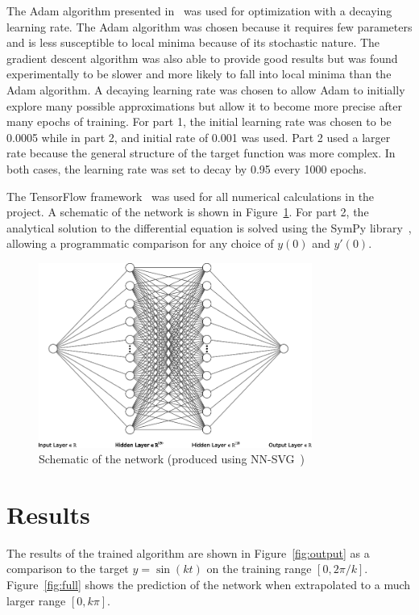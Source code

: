 \documentclass{article}
\begin{document}
        The Adam algorithm presented in~\cite{adam} was used for optimization with a decaying learning rate. The Adam algorithm was chosen because it requires few parameters and is less susceptible to local minima because of its stochastic nature. The gradient descent algorithm was also able to provide good results but was found experimentally to be slower and more likely to fall into local minima than the Adam algorithm. A decaying learning rate was chosen to allow Adam to initially explore many possible approximations but allow it to become more precise after many epochs of training. For part 1, the initial learning rate was chosen to be 0.0005 while in part 2, and initial rate of 0.001 was used. Part 2 used a larger rate because the general structure of the target function was more complex. In both cases, the learning rate was set to decay by 0.95 every 1000 epochs.

        The TensorFlow framework~\cite{tf} was used for all numerical calculations in the project. A schematic of the network is shown in Figure~\ref{fig:network}. For part 2, the analytical solution to the differential equation is solved using the SymPy library~\cite{sympy}, allowing a programmatic comparison for any choice of $y(0)$ and $y'(0)$.

        \begin{figure}[!htbp]
            \centering
            \caption{Schematic of the network (produced using NN-SVG~\cite{schematic})} \label{fig:network}
            \includegraphics[width=0.8\textwidth]{nn.png}
        \end{figure}

    \section{Results}
        The results of the trained algorithm are shown in Figure~\ref{fig:output} as a comparison to the target $y=\sin(kt)$ on the training range $[0,2\pi/k]$. Figure~\ref{fig:full} shows the prediction of the network when extrapolated to a much larger range $[0,k\pi]$.
\end{document}
